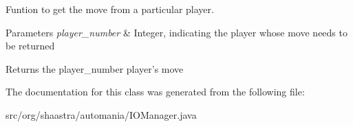 Funtion to get the move from a particular player. 


\begin{DoxyParams}{Parameters}
{\em \-p\-l\-a\-y\-e\-r\_\-\-n\-u\-m\-b\-e\-r} & Integer, indicating the player whose move needs to be returned \\
\hline
\end{DoxyParams}
\begin{DoxyReturn}{Returns}
the \-p\-l\-a\-y\-e\-r\_\-\-n\-u\-m\-b\-e\-r player's move 
\end{DoxyReturn}


The documentation for this class was generated from the following file:\begin{DoxyCompactItemize}
\item 
\-s\-r\-c\-/\-o\-r\-g\-/\-s\-h\-a\-a\-s\-t\-r\-a\-/\-a\-u\-t\-o\-m\-a\-n\-i\-a\-/\-I\-O\-M\-a\-n\-a\-g\-e\-r\-.\-j\-a\-v\-a\end{DoxyCompactItemize}
